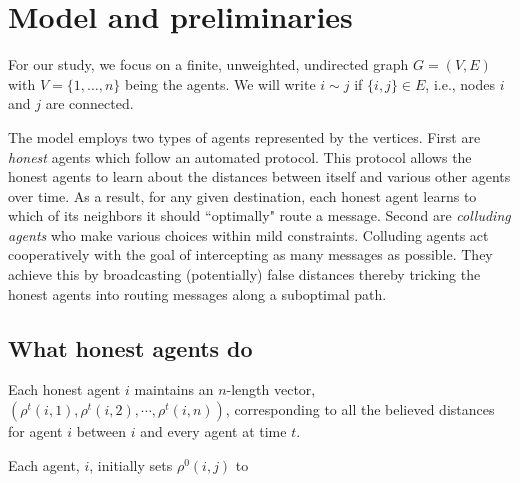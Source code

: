 \documentclass[reprint]{revtex4-1}
\begin{document}
\section{Model and preliminaries} \label{sec:models}

For our study, we focus on a finite, unweighted, undirected graph $G =
(V,E)$ with $V = \{1, \dots, n\}$ being the agents. We will write $i \sim j$ if $\{i,j\} \in E$, i.e., nodes $i$ and $j$ are connected.

The model employs two types of agents represented by the vertices. First are {\it honest} agents which follow an automated protocol. This protocol allows the honest agents to learn about the distances between itself and various other agents over time. As a result, for any given destination, each honest agent learns to which of its neighbors it should ``optimally" route a message. Second are {\it colluding agents} who make various choices within mild constraints. Colluding agents act cooperatively with the goal of intercepting as many messages as possible. They achieve this by broadcasting (potentially) false distances thereby tricking the honest agents into routing messages along a suboptimal path.





\subsection{What honest agents do} \label{sec:synchronization}

Each honest agent $i$ maintains an $n$-length vector, $(\rho^t(i,1), \rho^t(i,2),\cdots,\rho^t(i,n))$, corresponding to all the believed distances for agent $i$ between $i$ and every agent at time $t$.

Each agent, $i$, initially sets $\rho^0(i,j)$ to
\end{document}
